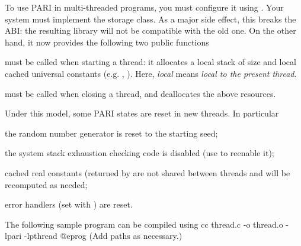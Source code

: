 %
%

To use PARI in multi-threaded programs, you must configure it using
. Your system must implement the 
storage class. As a major side effect, this breaks the  ABI: the
resulting library will not be compatible with the old one. On the other hand,
it now provides the following two public functions

 must be called when starting a
thread: it allocates a local stack of size  and local cached
universal constants (e.g. , ). Here, \emph{local} means
\emph{local to the present thread}.

 must be called when closing a thread,
and deallocates the above resources.

Under this model, some PARI states are reset in new threads. In particular

\item the random number generator is reset to the starting seed;

\item the system stack exhaustion checking code is disabled (use
 to reenable it);

\item cached real constants (returned by  are not
shared between threads and will be recomputed as needed;

\item error handlers (set with ) are reset.

\noindent The following sample program can be compiled using
\bprog
    cc thread.c -o thread.o -lpari -lpthread
@eprog\noindent
(Add  paths as necessary.)

\noindent{}

\vfill\eject
